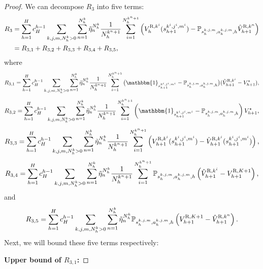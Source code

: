 \documentclass{article}
\newcommand{\R}{\textnormal{R}}
\begin{document}
\begin{proof}
 We can decompose $R_3$ into five terms:
\begin{align*}
     R_3 &= \sum_{h=1}^H c_H^{h-1}\sum_{k,j,m,N_h^k >0}\sum_{n=1}^{N_h^k} \Tilde{\eta}_n^{N_h^k}\frac{1}{N_h^{k^n+1}} \sum_{i=1}^{N_h^{k^n+1}}\left(V_h^{\R,k^i}(s_{h+1}^{k^i,j^i,m^i})-\mathbb{P}_{s_h^{k,j,m}, a_h^{k,j,m},h}\hat{V}_{h+1}^{\R,k^n}\right) \\
     & = R_{3,1}+ R_{3,2}+R_{3,3}+R_{3,4}+R_{3,5},
\end{align*}
where
\begin{align*}
    R_{3,1} = \sum_{h=1}^H c_H^{h-1}\sum_{k,j,m,N_h^k >0}\sum_{n=1}^{N_h^k} \Tilde{\eta}_n^{N_h^k}\frac{1}{N_h^{k^n+1}} \sum_{i=1}^{N_h^{k^n+1}}\big(\mathbbm{1}_{s_{h+1}^{k^i,j^i,m^i}}-\mathbb{P}_{s_h^{k,j,m}, a_h^{k,j,m},h}\big)(\hat{V}_{h+1}^{\R,k^i}-V_{h+1}^{\star}),
\end{align*}
\begin{align*}
    R_{3,2} = \sum_{h=1}^H c_H^{h-1}\sum_{k,j,m,N_h^k >0}\sum_{n=1}^{N_h^k} \Tilde{\eta}_n^{N_h^k}\frac{1}{N_h^{k^n+1}} \sum_{i=1}^{N_h^{k^n+1}}\left(\mathbbm{1}_{s_{h+1}^{k^i,j^i,m^i}}-\mathbb{P}_{s_h^{k,j,m}, a_h^{k,j,m},h}\right)V_{h+1}^{\star},
\end{align*}
\begin{align*}
    R_{3,3} = \sum_{h=1}^H c_H^{h-1}\sum_{k,j,m,N_h^k >0}\sum_{n=1}^{N_h^k} \Tilde{\eta}_n^{N_h^k}\frac{1}{N_h^{k^n+1}} \sum_{i=1}^{N_h^{k^n+1}}\left(V_{h+1}^{\R,k^i}(s_{h+1}^{k^i,j^i,m^i})-\hat{V}_{h+1}^{\R,k^i}(s_{h+1}^{k^i,j^i,m^i})\right),
\end{align*}
\begin{align*}
    R_{3,4} = \sum_{h=1}^H c_H^{h-1}\sum_{k,j,m,N_h^k >0}\sum_{n=1}^{N_h^k} \Tilde{\eta}_n^{N_h^k}\frac{1}{N_h^{k^n+1}} \sum_{i=1}^{N_h^{k^n+1}}\mathbb{P}_{s_h^{k,j,m}, a_h^{k,j,m},h}\left(\hat{V}_{h+1}^{\R,k^i}-V_{h+1}^{\R,K+1}\right),
\end{align*}
and
\begin{align*}
    R_{3,5} = \sum_{h=1}^H c_H^{h-1}\sum_{k,j,m,N_h^k >0}\sum_{n=1}^{N_h^k} \Tilde{\eta}_n^{N_h^k}\mathbb{P}_{s_h^{k,j,m}, a_h^{k,j,m},h}\left(V_{h+1}^{\R,K+1}-\hat{V}_{h+1}^{\R,k^n}\right).
\end{align*}
Next, we will bound these five terms respectively:

\textbf{Upper bound of $R_{3,1}$:}


\end{proof}
\end{document}

